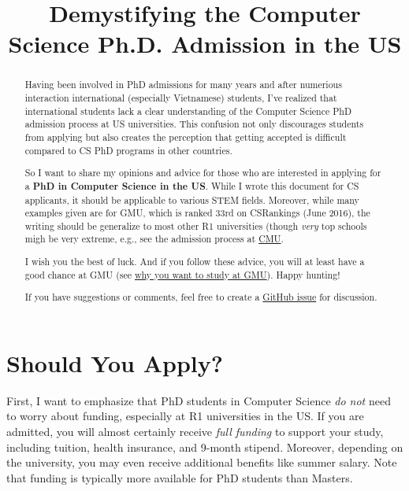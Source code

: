 \documentclass[10pt]{article}
\title{Demystifying the Computer Science Ph.D. Admission in the US}
\date{}
\begin{document}
\maketitle

\begin{abstract}
Having been involved in PhD admissions for many years and after
numerious interaction international (especially Vietnamese) students, I've
realized that international students lack a clear understanding of
the Computer Science PhD admission process at US universities. This confusion not only
discourages students from applying but also creates the perception that
getting accepted is difficult compared to CS PhD programs in other countries.

So I want to share my opinions and advice for those who are interested in applying for a \textbf{PhD in Computer Science in the US}.
While I wrote this document for CS applicants, it should be applicable to various STEM fields.
Moreover, while many examples given are for GMU, which is ranked 33rd on CSRankings (June 2016), the writing should be generalize to most other R1 universities  (though \emph{very} top schools migh be very extreme, e.g., see the admission process at \href{https://da-data.blogspot.com/2015/03/reflecting-on-cs-graduate-admissions.html}{CMU}.

I wish you the best of luck. And if you follow these advice,
you will at least have a good chance at GMU (see
\href{https://github.com/dynaroars/dynaroars.github.io/wiki/About-GMU}{why
you want to study at GMU}). Happy hunting!

If you have suggestions or comments, feel free to create a \href{https://github.com/dynaroars/dynaroars.github.io/issues}{GitHub issue} for discussion.
\end{abstract}

\section{Should You Apply?}


First, I want to emphasize that PhD students in Computer
Science \emph{do not} need to worry about funding, especially at R1
universities in the US. If you are admitted, you will almost certainly
receive \emph{full funding} to support your study, including tuition,
health insurance, and 9-month stipend. Moreover, depending on the university,
you may even receive additional benefits like summer salary. Note that
funding is typically more available for PhD students than 
Masters. %
\end{document}

